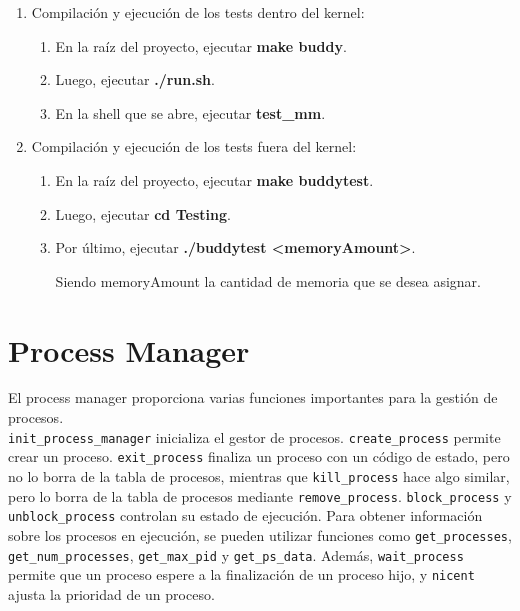 \documentclass{article}
\begin{document}
\begin{enumerate}

\item Compilación y ejecución de los tests dentro del kernel:

\begin{enumerate}
    \item En la raíz del proyecto, ejecutar \textbf{make buddy}.
    \item Luego, ejecutar \textbf{./run.sh}.
    \item En la shell que se abre, ejecutar \textbf{test\_mm}.
\end{enumerate}

\item Compilación y ejecución de los tests fuera del kernel:

\begin{enumerate}
    \item En la raíz del proyecto, ejecutar \textbf{make buddytest}.
    \item Luego, ejecutar \textbf{cd Testing}.
    \item Por último, ejecutar \textbf{./buddytest \textless memoryAmount\textgreater}.

    Siendo memoryAmount la cantidad de memoria que se desea asignar.
\end{enumerate}
\end{enumerate}

\section {Process Manager}
El process manager proporciona varias funciones importantes para la gestión de procesos. \\
\texttt{init\_process\_manager} inicializa el gestor de procesos. \texttt{create\_process} permite crear un proceso. \texttt{exit\_process} finaliza un proceso con un código de estado, pero no lo borra de la tabla de procesos, mientras que \texttt{kill\_process} hace algo similar, pero lo borra de la tabla de procesos mediante \texttt{remove\_process}. \texttt{block\_process} y \texttt{unblock\_process} controlan su estado de ejecución. Para obtener información sobre los procesos en ejecución, se pueden utilizar funciones como \texttt{get\_processes}, \texttt{get\_num\_processes}, \texttt{get\_max\_pid} y \texttt{get\_ps\_data}. Además, \texttt{wait\_process} permite que un proceso espere a la finalización de un proceso hijo, y \texttt{nicent} ajusta la prioridad de un proceso.
\end{document}
